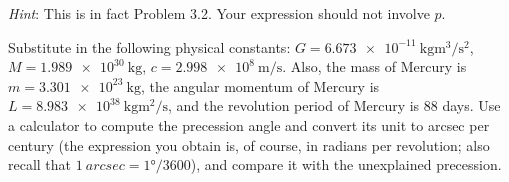 \documentclass[../psets.tex]{subfiles}
\begin{document}
\begin{enumerate}
    \emph{Hint}: This is in fact Problem 3.2. Your expression should not involve $p$.\par
    Substitute in the following physical constants: $G=\SI{6.673e-11}{\kilo\gram\cubic\meter\per\second\squared}$, $M=\SI{1.989e30}{\kilo\gram}$, $c=\SI{2.998e8}{\meter\per\second}$. Also, the mass of Mercury is $m=\SI{3.301e23}{\kilo\gram}$, the angular momentum of Mercury is $L=\SI{8.983e38}{\kilo\gram\meter\squared\per\second}$, and the revolution period of Mercury is 88 days. Use a calculator to compute the precession angle and convert its unit to arcsec per century (the expression you obtain is, of course, in radians per revolution; also recall that $\SI{1}{arcsec}=\ang{1}/3600$), and compare it with the unexplained precession.
\end{enumerate}
\end{document}
